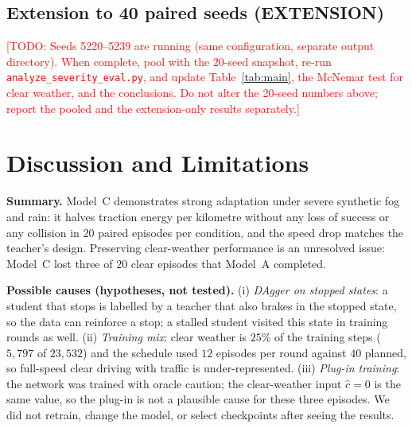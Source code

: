 \documentclass[conference]{IEEEtran}
\newcommand{\todo}[1]{\textcolor{red}{[TODO: #1]}}
\newcommand{\chat}{\hat{c}}
\begin{document}
\subsection{Extension to 40 paired seeds (EXTENSION)}
\todo{Seeds 5220--5239 are running (same configuration, separate output directory). When complete, pool with the 20-seed snapshot, re-run \texttt{analyze\_severity\_eval.py}, and update Table~\ref{tab:main}, the McNemar test for clear weather, and the conclusions. Do not alter the 20-seed numbers above; report the pooled and the extension-only results separately.}

\section{Discussion and Limitations}
\label{sec:limits}
\textbf{Summary.} Model~C demonstrates strong adaptation under severe synthetic fog and rain: it halves traction energy per kilometre without any loss of success or any collision in $20$ paired episodes per condition, and the speed drop matches the teacher's design. Preserving clear-weather performance is an unresolved issue: Model~C lost three of $20$ clear episodes that Model~A completed.

\textbf{Possible causes (hypotheses, not tested).} (i) \emph{DAgger on stopped states}: a student that stops is labelled by a teacher that also brakes in the stopped state, so the data can reinforce a stop; a stalled student visited this state in training rounds as well. (ii) \emph{Training mix}: clear weather is $25\%$ of the training steps ($5{,}797$ of $23{,}532$) and the schedule used $12$ episodes per round against $40$ planned, so full-speed clear driving with traffic is under-represented. (iii) \emph{Plug-in training}: the network was trained with oracle caution; the clear-weather input $\chat=0$ is the same value, so the plug-in is not a plausible cause for these three episodes. We did not retrain, change the model, or select checkpoints after seeing the results.
\end{document}
